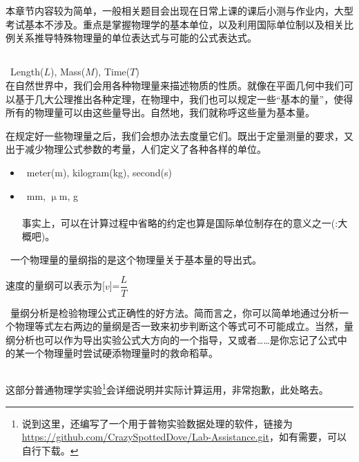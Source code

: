 	\chapter[测量]{}
	本章节内容较为简单，一般相关题目会出现在日常上课的课后小测与作业内，大型考试基本不涉及。重点是掌握物理学的基本单位，以及利用国际单位制以及相关比例关系推导特殊物理量的单位表达式与可能的公式表达式。
	\section[单位与量纲]{}
	\begin{Itemize}
		\item {}\ \eg Length($L$), Mass($M$), Time($T$)\\
		在自然世界中，我们会用各种物理量来描述物质的性质。就像在平面几何中我们可以基于几大公理推出各种定理，在物理中，我们也可以规定一些“基本的量”，使得所有的物理量可以由这些量导出。自然地，我们就称呼这些量为基本量。
		\item {}在规定好一些物理量之后，我们会想办法去度量它们。既出于定量测量的要求，又出于减少物理公式参数的考量，人们定义了各种各样的单位。
		\begin{itemize}
			\item {}\ \eg meter(m), kilogram(kg), second(s)
			\item {}\ \eg mm, $\upmu$m, g\\
			\\
			事实上，可以在计算过程中省略的约定也算是国际单位制存在的意义之一(\dove :大概吧)。
		\end{itemize}
		\item {}\ 一个物理量的量纲指的是这个物理量关于基本量的导出式。
		
		\eg 速度的量纲可以表示为[$v$]=$\dfrac{L}{T}$
		
		\item {}\ 量纲分析是检验物理公式正确性的好方法。简而言之，你可以简单地通过分析一个物理等式左右两边的量纲是否一致来初步判断这个等式可不可能成立。当然，量纲分析也可以作为导出实验公式大方向的一个指导，又或者……是你忘记了公式中的某一个物理量时尝试硬添物理量时的救命稻草。
	\end{Itemize}
	\section[数据处理]{}
	这部分普通物理学实验\footnote{说到这里，\dove 还编写了一个用于普物实验数据处理的软件，链接为 \url{https://github.com/CrazySpottedDove/Lab-Assistance.git}，如有需要，可以自行下载。}会详细说明并实际计算运用，非常抱歉，此处略去。